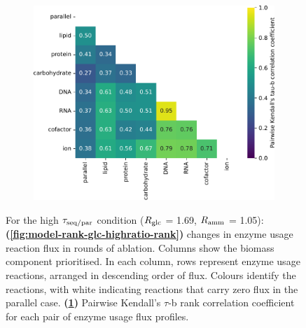 \begin{figure}
\begin{subfigure}[t]{0.45\textwidth}
    \includegraphics[width=\linewidth]{CompareEnzUse_glc01p69_pyrUnres_amm01p05_2.pdf}
    \caption{
    }
    \label{fig:model-rank-glc-highratio-kendall}
  \end{subfigure}%

  \caption[
    Changes in enzyme usage reaction flux and Kendall's $\tau$-b rank correlation coefficient for each pair, $\exchrate{glc}$ = \SI{1.69}{\mmolgdwh}, $\exchrate{amm}$ = \SI{1.05}{\mmolgdwh}.
    ]{
    For the high $\tau_{\mathrm{seq}/\mathrm{par}}$ condition ($\exchrate{glc}$ = \SI{1.69}{\mmolgdwh}, $\exchrate{amm}$ = \SI{1.05}{\mmolgdwh}):
    \textbf{(\ref{fig:model-rank-glc-highratio-rank})}
    changes in enzyme usage reaction flux in rounds of ablation.
    Columns show the biomass component prioritised.
    In each column, rows represent enzyme usage reactions, arranged in descending order of flux.
    Colours identify the reactions, with white indicating reactions that carry zero flux in the parallel case.
    \textbf{(\ref{fig:model-rank-glc-highratio-kendall})}
    Pairwise Kendall's $\tau$-b rank correlation coefficient \parencite{kendallTREATMENTTIESRANKING1945} for each pair of enzyme usage flux profiles.
  }
  \label{fig:model-rank-glc-highratio}
\end{figure}

